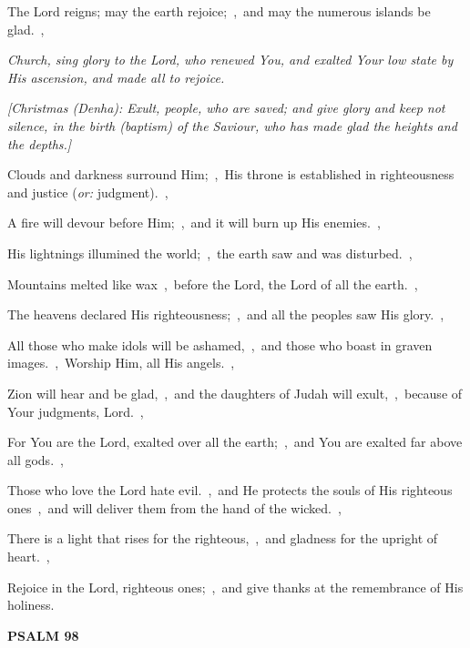 \documentclass[12pt,twoside,a5paper]{article}
\newcommand{\psalm}[1]{\textbf{PSALM {#1}}\nopagebreak}
\newcommand{\qanona}[1]{{\liturgicalhint{Qanona.} \emph{#1}}}
\newcommand{\translationoption}[1]{\emph{or:} #1}
\begin{document}
\begin{normalparskip}
  The Lord reigns; may the earth rejoice;~\sep\ and may the numerous islands be glad.~\sep

  \qanona{Church, sing glory to the Lord, who renewed You, and exalted Your low state by His ascension, and made all to rejoice.}

  \emph{[Christmas (Denha): Exult, people, who are saved; and give glory and keep not silence, in the birth (baptism) of the Saviour, who has made glad the heights and the depths.]}

  Clouds and darkness surround Him;~\sep\ His throne is established in righteousness and justice (\translationoption{judgment}).~\sep

  A fire will devour before Him;~\sep\ and it will burn up His enemies.~\sep

  His lightnings illumined the world;~\sep\ the earth saw and was disturbed.~\sep

  Mountains melted like wax~\sep\ before the Lord, the Lord of all the earth.~\sep

  The heavens declared His righteousness;~\sep\ and all the peoples saw His glory.~\sep

  All those who make idols will be ashamed,~\sep\ and those who boast in graven images.~\sep\ Worship Him, all His angels.~\sep

  Zion will hear and be glad,~\sep\ and the daughters of Judah will exult,~\sep\ because of Your judgments, Lord.~\sep

  For You are the Lord, exalted over all the earth;~\sep\ and You are exalted far above all gods.~\sep

  Those who love the Lord hate evil.~\sep\ and He protects the souls of His righteous ones~\sep\ and will deliver them from the hand of the wicked.~\sep

  There is a light that rises for the righteous,~\sep\ and gladness for the upright of heart.~\sep

  Rejoice in the Lord, righteous ones;~\sep\ and give thanks at the remembrance of His holiness.
\end{normalparskip}

\psalm{98}
\end{document}
